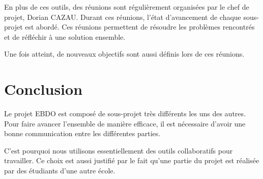 \documentclass{article}
\begin{document}
En plus de ces outils, des réunions sont régulièrement organisées par le chef de projet, Dorian CAZAU. Durant ces réunions, l'état d'avancement de chaque sous-projet est abordé. Ces réunions permettent de résoudre les problèmes rencontrés et de réfléchir à une solution ensemble.

Une fois atteint, de nouveaux objectifs sont aussi définis lors de ces réunions.

\section{Conclusion}

Le projet EBDO est composé de sous-projet très différents les uns des autres. Pour faire avancer l'ensemble de manière efficace, il est nécessaire d'avoir une bonne communication entre les différentes parties.

C'est pourquoi nous utilisons essentiellement des outils collaboratifs pour travailler. Ce choix est aussi justifié par le fait qu'une partie du projet est réalisée par des étudiants d'une autre école.
\end{document}
